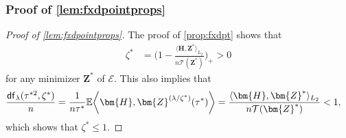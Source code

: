 \documentclass[10pt]{article}
\newcommand{\s}{^*}
\theoremstyle{definition}
\begin{document}
\subsubsection{Proof of \cref{lem:fxdpointprops}}


\begin{proof}[Proof of \cref{lem:fxdpointprops}]
The proof of \cref{prop:fxdpt} shows that
\begin{align}
    \zeta\s &= \bigg( 1 - \frac{\langle \bm{H}, \bm{Z}\s \rangle_{L_2} }{n \mathcal{T}(\bm{Z}\s)} \bigg)_+ > 0
\end{align}
for any minimizer $\bm{Z}\s$ of $\mathcal{E}$.  This also implies that 
\begin{align}
\frac{{\sf df}_{\lambda}(\tau^{*2},\zeta\s)}{n} &=
\frac{1}{n\tau\s} \mathbb{E} \bigg \langle \bm{H}, \bm{Z}^{(\lambda/\zeta\s)}(\tau\s) \bigg \rangle  =  \frac{\langle \bm{H}, \bm{Z}\s\rangle_{L_2}}{n \mathcal{T}(\bm{Z}\s)} < 1,
\end{align}
which shows that $\zeta\s \leq 1$.  


\end{proof}
\end{document}
